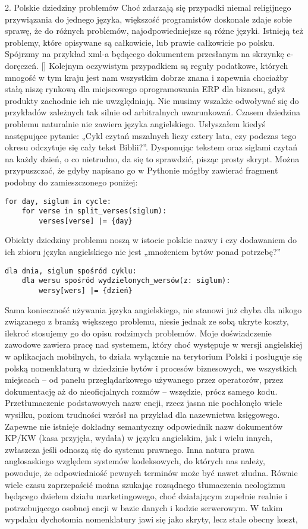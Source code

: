 2. Polskie dziedziny problemów
Choć zdarzają się przypadki niemal religijnego przywiązania do jednego języka, większość programistów doskonale zdaje sobie sprawę, że do różnych problemów, najodpowiedniejsze są różne języki. Istnieją też problemy, które opisywane są całkowicie, lub prawie całkowicie po polsku. Spójrzmy na przykład xml-a będącego dokumentem przesłanym na skrzynkę e-doręczeń. 
[]
Kolejnym oczywistym przypadkiem są reguły podatkowe, których mnogość w tym kraju jest nam wszystkim dobrze znana i zapewnia chociażby stałą niszę rynkową dla miejscowego oprogramowania ERP dla biznesu, gdyż produkty zachodnie ich nie uwzględniają. Nie musimy wszakże odwoływać się do przykładów zależnych tak silnie od arbitralnych uwarunkowań. Czasem dziedzina problemu naturalnie nie zawiera języka angielskiego.
Usłyszałem kiedyś następujące pytanie: „Cykl czytań mszalnych liczy cztery lata, czy podczas tego okresu odczytuje się cały tekst Biblii?”. Dysponując tekstem oraz siglami czytań na każdy dzień, o co nietrudno, da się to sprawdzić, pisząc prosty skrypt. Można przypuszczać, że gdyby napisano go w Pythonie mógłby zawierać fragment podobny do zamieszczonego poniżej:
\begin{lstlisting}
for day, siglum in cycle:
	for verse in split_verses(siglum):
		verses[verse] |= {day}    
\end{lstlisting}

Obiekty dziedziny problemu noszą w istocie polskie nazwy i czy dodawaniem do ich zbioru języka angielskiego nie jest „mnożeniem bytów ponad potrzebę?”
\begin{lstlisting}
dla dnia, siglum spośród cyklu:
	dla wersu spośród wydzielonych_wersów(z: siglum):
		wersy[wers] |= {dzień}
\end{lstlisting}
Sama konieczność używania języka angielskiego, nie stanowi już chyba dla nikogo związanego z branżą większego problemu, niesie jednak ze sobą ukryte koszty, ilekroć stosujemy go do opisu rodzimych problemów. Moje doświadczenie zawodowe zawiera pracę nad systemem, który choć występuje w wersji angielskiej w aplikacjach mobilnych, to działa wyłącznie na terytorium Polski i posługuje się polską nomenklaturą w dziedzinie bytów i procesów biznesowych, we wszystkich miejscach – od panelu przeglądarkowego używanego przez operatorów, przez dokumentację aż do nieoficjalnych rozmów – wszędzie, prócz samego kodu. Przetłumaczenie podstawowych nazw encji, rzecz jasna nie pochłonęło wiele wysiłku, poziom trudności wzrósł na przykład dla nazewnictwa księgowego. Zapewne nie istnieje dokładny semantyczny odpowiednik nazw dokumentów KP/KW (kasa przyjęła, wydała) w języku angielskim, jak i wielu innych, zwłaszcza jeśli odnoszą się do systemu prawnego. Inna natura prawa anglosaskiego względem systemów kodeksowych, do których nas należy, powoduje, że odpowiedniość pewnych terminów może być nawet złudna. Równie wiele czasu zaprzepaścić można szukając rozsądnego tłumaczenia neologizmu będącego dziełem działu marketingowego, choć działającym zupełnie realnie i potrzebującego osobnej encji w bazie danych i kodzie serwerowym. W takim wypdaku dychotomia nomenklatury jawi się jako skryty, lecz stale obecny koszt, 

